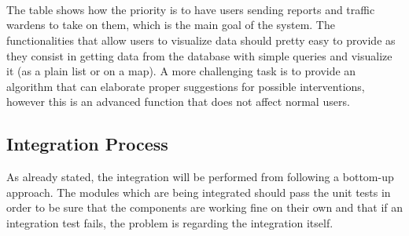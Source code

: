 \documentclass{article}
\begin{document}
\\ \\ \\
The table shows how the priority is to have users sending reports and traffic wardens to take on them, which is the  main goal of the system.
The functionalities that allow users to visualize data should pretty easy to provide as they consist in getting data from the database with simple queries and visualize it (as a plain list or on a map).
A more challenging task is to provide an algorithm that can elaborate proper suggestions for possible interventions, however this is an advanced function that does not affect normal users. 

\subsection{Integration Process}
As already stated, the integration will be performed from following a bottom-up approach.
The modules which are being integrated should pass the unit tests in order to be sure that the components are working fine on
their own and that if an integration test fails, the problem is regarding the integration itself.
\end{document}
